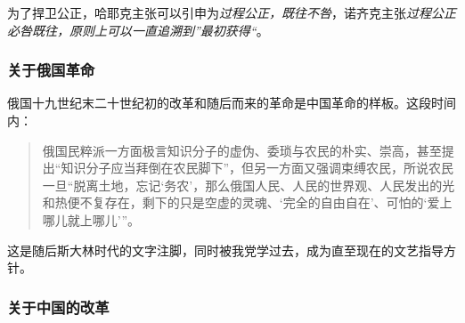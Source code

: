 为了捍卫公正，哈耶克主张可以引申为\emph{过程公正，既往不咎}，诺齐克主张\emph{过程公正必咎既往，原则上可以一直追溯到”最初获得“}。

\subsubsection{关于俄国革命}
俄国十九世纪末二十世纪初的改革和随后而来的革命是中国革命的样板。这段时间内：
\begin{quotation}
俄国民粹派一方面极言知识分子的虚伪、委琐与农民的朴实、崇高，甚至提出“知识分子应当拜倒在农民脚下”，但另一方面又强调束缚农民，所说农民一旦“脱离土地，忘记‘务农’，那么俄国人民、人民的世界观、人民发出的光和热便不复存在，剩下的只是空虚的灵魂、‘完全的自由自在’、可怕的‘爱上哪儿就上哪儿’”。
\end{quotation}
这是随后斯大林时代的文字注脚，同时被我党学过去，成为直至现在的文艺指导方针。

\subsubsection{关于中国的改革}
